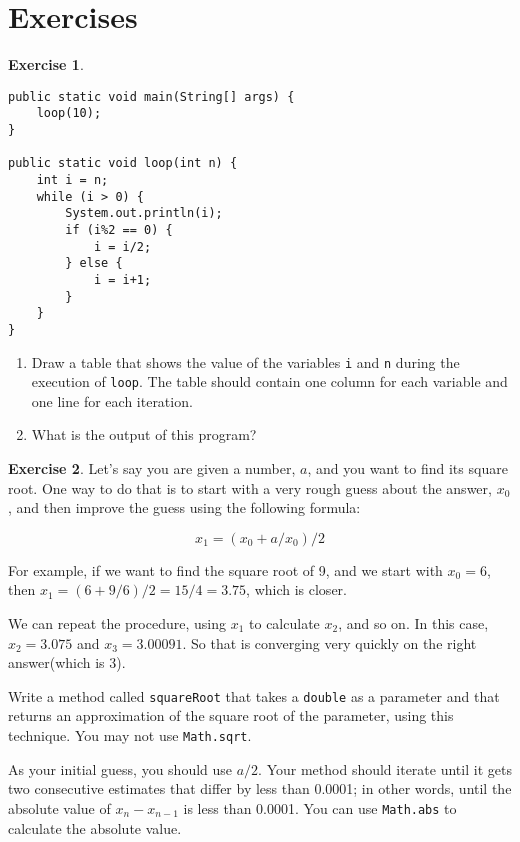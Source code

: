 \documentclass[12pt]{book}
\theoremstyle{definition}
\newtheorem{excz}{Exercise}[chapter]
\newenvironment{exercise}{\bigskip\begin{excz}\mbox{}}{\end{excz}}
\begin{document}
\section{Exercises}

\begin{exercise}\label{infloop}

\begin{lstlisting}
public static void main(String[] args) {
    loop(10);
}

public static void loop(int n) {
    int i = n;
    while (i > 0) {
        System.out.println(i);
        if (i%2 == 0) {
            i = i/2;
        } else {
            i = i+1;
        }
    }
}
\end{lstlisting}
%
\begin{enumerate}

\item Draw a table that shows the value of the variables {\tt i}
and {\tt n} during the execution of {\tt loop}.  The table should
contain one column for each variable and one line for each
iteration.

\item What is the output of this program?  

\end{enumerate}
\end{exercise}


\begin{exercise}
Let's say you are given a number, $a$, and you want to find
its square root.  One way to do that is to start with a very
rough guess about the answer, $x_0$, and then improve
the guess using the following formula:

\begin{equation}
x_1 =(x_0 + a/x_0) / 2
\end{equation}

For example, if we want to find the square root of 9, and
we start with $x_0 = 6$, then $x_1 =(6 + 9/6) /2 = 15/4 = 3.75$,
which is closer.

We can repeat the procedure, using $x_1$ to calculate $x_2$,
and so on.  In this case, $x_2 = 3.075$ and $x_3 = 3.00091$.
So that is converging very quickly on the right answer(which
is 3).

Write a method called {\tt squareRoot} that takes a {\tt double}
as a parameter and that returns an approximation of the square
root of the parameter, using this technique.  You may not use
{\tt Math.sqrt}.

As your initial guess, you should use $a/2$.  Your method should
iterate until it gets two consecutive estimates that differ by less
than 0.0001; in other words, until the absolute value of $x_n -
x_{n-1}$ is less than 0.0001.  You can use {\tt Math.abs} to calculate
the absolute value.
\end{exercise}
\end{document}
